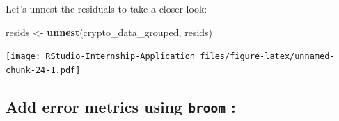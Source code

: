 \documentclass[
]{book}
\newenvironment{Shaded}{\begin{snugshade}}{\end{snugshade}}
\newcommand{\DataTypeTok}[1]{\textcolor[rgb]{0.13,0.29,0.53}{#1}}
\newcommand{\DecValTok}[1]{\textcolor[rgb]{0.00,0.00,0.81}{#1}}
\newcommand{\KeywordTok}[1]{\textcolor[rgb]{0.13,0.29,0.53}{\textbf{#1}}}
\newcommand{\NormalTok}[1]{#1}
\newcommand{\OperatorTok}[1]{\textcolor[rgb]{0.81,0.36,0.00}{\textbf{#1}}}
\newcommand{\OtherTok}[1]{\textcolor[rgb]{0.56,0.35,0.01}{#1}}
\newcommand{\StringTok}[1]{\textcolor[rgb]{0.31,0.60,0.02}{#1}}
\begin{document}
Let's unnest the residuals to take a closer look:

\begin{Shaded}
\begin{Highlighting}[]
\NormalTok{resids <-}\StringTok{ }\KeywordTok{unnest}\NormalTok{(crypto_data_grouped, resids)}
\end{Highlighting}
\end{Shaded}

\begin{Shaded}
\end{Shaded}

\texttt{[image: RStudio-Internship-Application\_files/figure-latex/unnamed-chunk-24-1.pdf]}

\hypertarget{add-error-metrics-using-broom-r-broom}{%
\subsection{\texorpdfstring{Add error metrics using \texttt{broom} \citep{R-broom}:}{Add error metrics using broom {[}@R-broom{]}:}}\label{add-error-metrics-using-broom-r-broom}}

\begin{Shaded}
\end{Shaded}
\end{document}
